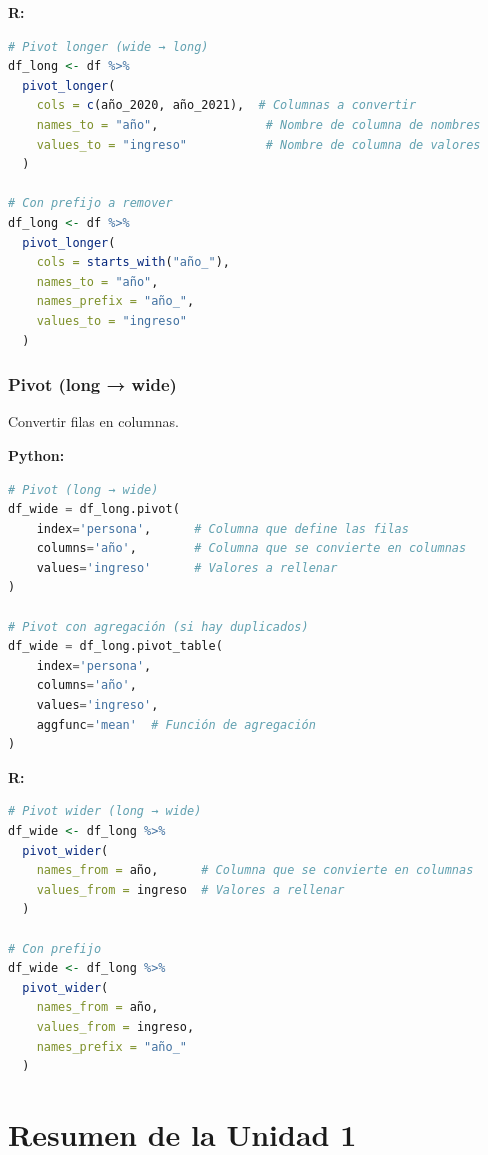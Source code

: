 \documentclass[a4paper,11pt]{article}
\begin{document}
\textbf{R:}
\begin{lstlisting}[language=R]
# Pivot longer (wide → long)
df_long <- df %>%
  pivot_longer(
    cols = c(año_2020, año_2021),  # Columnas a convertir
    names_to = "año",               # Nombre de columna de nombres
    values_to = "ingreso"           # Nombre de columna de valores
  )

# Con prefijo a remover
df_long <- df %>%
  pivot_longer(
    cols = starts_with("año_"),
    names_to = "año",
    names_prefix = "año_",
    values_to = "ingreso"
  )
\end{lstlisting}

\subsubsection{Pivot (long → wide)}

Convertir filas en columnas.

\textbf{Python:}
\begin{lstlisting}[language=Python]
# Pivot (long → wide)
df_wide = df_long.pivot(
    index='persona',      # Columna que define las filas
    columns='año',        # Columna que se convierte en columnas
    values='ingreso'      # Valores a rellenar
)

# Pivot con agregación (si hay duplicados)
df_wide = df_long.pivot_table(
    index='persona',
    columns='año',
    values='ingreso',
    aggfunc='mean'  # Función de agregación
)
\end{lstlisting}

\textbf{R:}
\begin{lstlisting}[language=R]
# Pivot wider (long → wide)
df_wide <- df_long %>%
  pivot_wider(
    names_from = año,      # Columna que se convierte en columnas
    values_from = ingreso  # Valores a rellenar
  )

# Con prefijo
df_wide <- df_long %>%
  pivot_wider(
    names_from = año,
    values_from = ingreso,
    names_prefix = "año_"
  )
\end{lstlisting}

\section*{Resumen de la Unidad 1}
\end{document}
